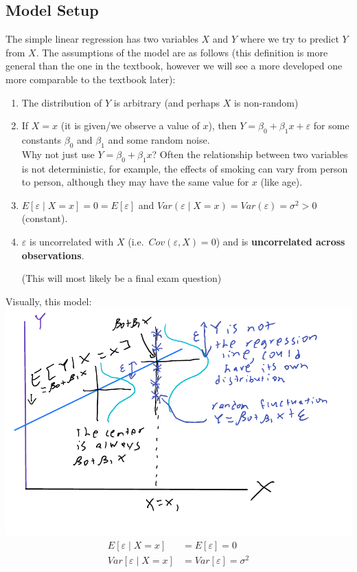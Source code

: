 \documentclass[12 pt]{article}
\begin{document}
\subsection{Model Setup}
The simple linear regression has two variables $X$ and $Y$ where we
try to predict $Y$ from $X$. The assumptions of the model are as
follows (this definition is more general than the one in the textbook,
however we will see a more developed one more comparable to the
textbook later):
\begin{enumerate}
\item The distribution of $Y$ is arbitrary (and perhaps $X$ is
  non-random)
\item If $X = x$ (it is given/we observe a value of $x$), then $Y =
  \beta_0 + \beta_1 x + \varepsilon$ for some constants $\beta_0$ and
  $\beta_1$ and some random noise.
  \\ Why not just use $Y = \beta_0 + \beta_1 x$? Often the
  relationship between two variables is not deterministic, for
  example, the effects of smoking can vary from person to person,
  although they may have the same value for $x$ (like age).
\item $E[\varepsilon \mid X = x] = 0 = E[\varepsilon]$ and
  $Var(\varepsilon \mid X = x) = Var(\varepsilon) =
  \sigma^2 > 0$ (constant).
\item $\varepsilon$ is uncorrelated with $X$ (i.e.\ $Cov(\varepsilon,
  X) = 0$) and is \textbf{uncorrelated across observations}.

  (This will most likely be a final exam question)
\end{enumerate}
Visually, this model:\\
\includegraphics[width=.9\textwidth]{6.pdf}
\begin{align*}
  E[\varepsilon \mid X = x] & = E[\varepsilon] = 0
  \\ Var[\varepsilon \mid X = x] & = Var[\varepsilon] = \sigma^2
\end{align*}
\end{document}
